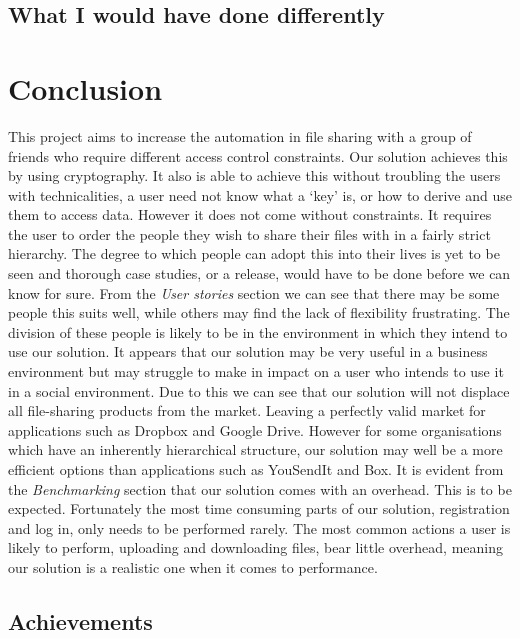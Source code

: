 \documentclass[12pt, titlepage]{article}
\begin{document}
\subsection{What I would have done differently}

\section{Conclusion}
This project aims to increase the automation in file sharing with a group of friends who require different access control constraints. Our solution achieves this by using cryptography. It also is able to achieve this without troubling the users with technicalities, a user need not know what a `key' is, or how to derive and use them to access data.
\newline \indent However it does not come without constraints. It requires the user to order the people they wish to share their files with in a fairly strict hierarchy. The degree to which people can adopt this into their lives is yet to be seen and thorough case studies, or a release, would have to be done before we can know for sure. From the \textit{User stories} section we can see that there may be some people this suits well, while others may find the lack of flexibility frustrating. The division of these people is likely to be in the environment in which they intend to use our solution. It appears that our solution may be very useful in a business environment but may struggle to make in impact on a user who intends to use it in a social environment. Due to this we can see that our solution will not displace all file-sharing products from the market. Leaving a perfectly valid market for applications such as Dropbox and Google Drive. However for some organisations which have an inherently hierarchical structure, our solution may well be a more efficient options than applications such as YouSendIt and Box.
\newline \indent It is evident from the \textit{Benchmarking} section that our solution comes with an overhead. This is to be expected. Fortunately the most time consuming parts of our solution, registration and log in, only needs to be performed rarely. The most common actions a user is likely to perform, uploading and downloading files, bear little overhead, meaning our solution is a realistic one when it comes to performance.

\subsection{Achievements}
\end{document}
